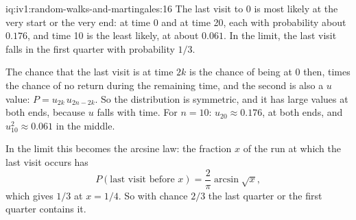 \begin{solution}{iq:iv1:random-walks-and-martingales:16}
The last visit to 0 is most likely at the very start or the very end: at time 0 and at time 20, each with probability about $0.176$, and time 10 is the least likely, at about $0.061$. In the limit, the last visit falls in the first quarter with probability $1/3$.

The chance that the last visit is at time $2k$ is the chance of being at 0 then, times the chance of no return during the remaining time, and the second is also a $u$ value: $P = u_{2k}\, u_{2n - 2k}$. So the distribution is symmetric, and it has large values at both ends, because $u$ falls with time. For $n = 10$: $u_{20} \approx 0.176$, at both ends, and $u_{10}^2 \approx 0.061$ in the middle.

In the limit this becomes the arcsine law: the fraction $x$ of the run at which the last visit occurs has
\[
P(\text{last visit before } x) = \frac{2}{\pi} \arcsin\sqrt{x},
\]
which gives $1/3$ at $x = 1/4$. So with chance $2/3$ the last quarter or the first quarter contains it.

\end{solution}

